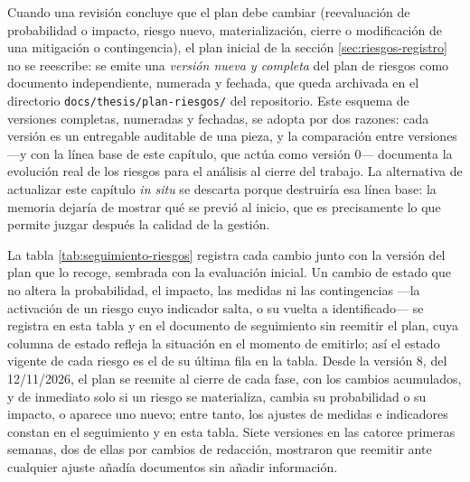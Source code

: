 Cuando una revisión concluye que el plan debe cambiar (reevaluación de probabilidad o impacto, riesgo nuevo, materialización, cierre o modificación de una mitigación o contingencia), el plan inicial de la sección \ref{sec:riesgos-registro} no se reescribe: se emite una \emph{versión nueva y completa} del plan de riesgos como documento independiente, numerada y fechada, que queda archivada en el directorio \texttt{docs/}\allowbreak\texttt{thesis/}\allowbreak\texttt{plan-riesgos/} del repositorio.
Este esquema de versiones completas, numeradas y fechadas, se adopta por dos razones: cada versión es un entregable auditable de una pieza, y la comparación entre versiones —y con la línea base de este capítulo, que actúa como versión 0— documenta la evolución real de los riesgos para el análisis al cierre del trabajo.
La alternativa de actualizar este capítulo \emph{in situ} se descarta porque destruiría esa línea base: la memoria dejaría de mostrar qué se previó al inicio, que es precisamente lo que permite juzgar después la calidad de la gestión.

La tabla \ref{tab:seguimiento-riesgos} registra cada cambio junto con la versión del plan que lo recoge, sembrada con la evaluación inicial.
Un cambio de estado que no altera la probabilidad, el impacto, las medidas ni las contingencias —la activación de un riesgo cuyo indicador salta, o su vuelta a identificado— se registra en esta tabla y en el documento de seguimiento sin reemitir el plan, cuya columna de estado refleja la situación en el momento de emitirlo; así el estado vigente de cada riesgo es el de su última fila en la tabla.
Desde la versión 8, del 12/11/2026, el plan se reemite al cierre de cada fase, con los cambios acumulados, y de inmediato solo si un riesgo se materializa, cambia su probabilidad o su impacto, o aparece uno nuevo; entre tanto, los ajustes de medidas e indicadores constan en el seguimiento y en esta tabla.
Siete versiones en las catorce primeras semanas, dos de ellas por cambios de redacción, mostraron que reemitir ante cualquier ajuste añadía documentos sin añadir información.


